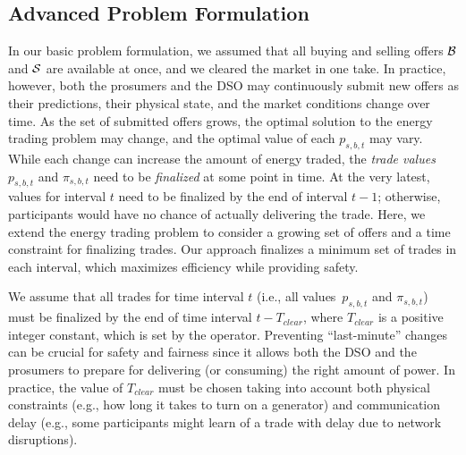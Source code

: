 \subsection{Advanced Problem Formulation}
\label{sec:extendedProblem}

In our basic problem formulation, we assumed that all buying and selling offers $\mathcal{B}$ and $\mathcal{S}$ are available at once, and we cleared the market in one take.
In practice, however, both the prosumers and the DSO may continuously submit new offers as their predictions, their physical state, and the market conditions change over time.
As the set of submitted offers grows, the optimal solution to the energy trading problem may change, and the optimal value of each $p_{s,b,t}$ may vary.
While each change can increase the amount of energy traded, the \emph{trade values} $p_{s,b,t}$ and $\pi_{s,b,t}$ need to be \emph{finalized} at some point in time.
At the very latest, values for interval $t$ need to be finalized by the end of interval $t - 1$; otherwise, participants would have no chance of actually delivering the trade.
Here, we extend the energy trading problem to consider a growing set of offers and a time constraint for finalizing trades.
Our approach finalizes a minimum set of trades in each interval, which maximizes efficiency while providing safety.


We assume that all trades for time interval $t$ (i.e., all values~$p_{s,b,t}$ and $\pi_{s,b,t}$) must be finalized by the end of time interval $t - T_{clear}$, where $T_{clear}$ is a positive integer constant, which is set by the operator. 
Preventing ``last-minute'' changes can be crucial for safety and fairness since it allows both the DSO and the prosumers to prepare for delivering (or consuming) the right amount of power. %
In practice, the value of $T_{clear}$ must be chosen taking into account both physical constraints (e.g., how long it takes to turn on a generator) and communication delay (e.g., some participants might learn of a trade with delay due to network disruptions).

